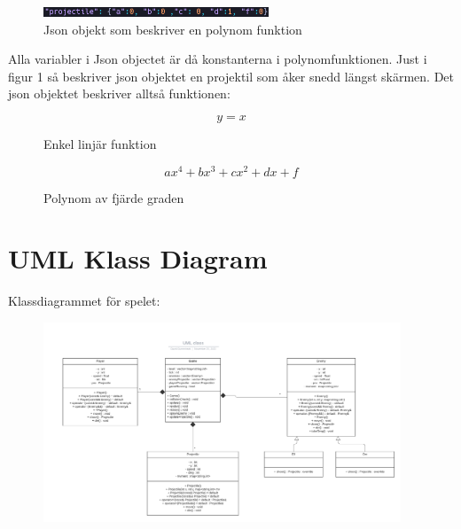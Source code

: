 \documentclass{TDP005mall}
\begin{document}
\begin{figure}[H]
  \begin{center}
    \includegraphics[width=0.6\textwidth]{poly.png}
  \end{center}
  \caption{Json objekt som beskriver en polynom funktion}
  \label{fig:}
\end{figure}
Alla variabler i Json objectet är då konstanterna i polynomfunktionen. Just i figur 1 så beskriver json objektet en projektil som åker snedd längst skärmen. 
Det json objektet beskriver alltså funktionen: 
\begin{figure}[H]
  \begin{center}
    $$y = x$$
  \end{center}
  \caption{Enkel linjär funktion}
  \label{fig:}
\end{figure}
\begin{figure}[H]
  \begin{center}
    $$ ax^4 + bx^3 + cx^2 + dx + f $$
  \end{center}
  \caption{Polynom av fjärde graden}
  \label{fig:}
\end{figure}

\vspace{10cm}

\section{UML Klass Diagram}
Klassdiagrammet för spelet:
\begin{figure}[H]
  \begin{center}
    \includegraphics[width=0.95\textwidth]{UML class.png}
  \end{center}
  \caption{}
  \label{fig:}
\end{figure}
\end{document}
